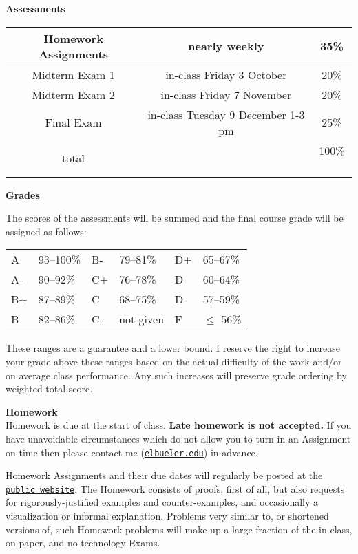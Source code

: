 \documentclass[12pt]{article}
\renewcommand{\emph}[1]{\textsf{\textbf{#1}}}
\newcommand{\localhead}[1]{\par\smallskip\textbf{#1} \smallskip\nobreak\\}%
\def\heading#1{\localhead{\large\emph{#1}}}
\begin{document}
\heading{Assessments}
\vskip -10pt

\begin{tabular}{|c|c|c|}
\hline
Homework Assignments & nearly weekly & 35\% \\
\hline
Midterm Exam 1 & in-class Friday 3 October  & 20\%  \\
\hline
Midterm Exam 2 & in-class Friday 7 November & 20\%  \\
\hline
Final Exam     & in-class Tuesday 9 December 1-3 pm & 25\% \\
\hline
total & & 100\% \, \\
\hline
\end{tabular}


\clearpage\newpage

\phantom{foo}
\heading{Grades}
\vskip -15pt

The scores of the assessments will be summed and the final course grade will be assigned as follows:

\begin{tabular}{llllll}
A  & 93--100\% & B- & 79--81\%  & D+ & 65--67\%  \\
A- & 90--92\%  & C+ & 76--78\%  & D  & 60--64\%  \\
B+ & 87--89\%  & C  & 68--75\%  & D- & 57--59\%  \\
B  & 82--86\%  & C- & not given & F  & $\le$ 56\%
\end{tabular}

These ranges are a guarantee and a lower bound.  I reserve the right to increase your grade above these ranges based on the actual difficulty of the work and/or on average class performance.  Any such increases will preserve grade ordering by weighted total score.


\heading{Homework}
Homework is due at the start of class.  \emph{Late homework is not accepted.}  If you have unavoidable circumstances which do not allow you to turn in an Assignment on time then please contact me (\href{mailto:elbueler@alaska.edu}{\texttt{elbueler\@@alaska.edu}}) in advance.

Homework Assignments and their due dates will regularly be posted at the \href{https://bueler.github.io/real/}{\texttt{public website}}.  The Homework consists of proofs, first of all, but also requests for rigorously-justified examples and counter-examples, and occasionally a visualization or informal explanation.  Problems very similar to, or shortened versions of, such Homework problems will make up a large fraction of the in-class, on-paper, and no-technology Exams.
\end{document}
